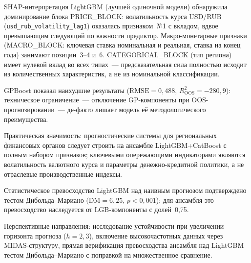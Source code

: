 \documentclass[12pt,a4paper]{article}
\begin{document}
SHAP-интерпретация LightGBM (лучшей одиночной модели) обнаружила
доминирование блока PRICE\_BLOCK: волатильность курса USD/RUB
(\texttt{usd\_rub\_volatility\_lag1}) оказалась признаком~№1 с вкладом,
вдвое превышающим следующий по важности предиктор. Макро-монетарные
признаки (MACRO\_BLOCK: ключевая ставка номинальная и реальная,
ставка на конец года) занимают позиции~3--4 и~6. CATEGORICAL\_BLOCK
(тип региона) имеет нулевой вклад во всех типах~--- предсказательная
сила полностью исходит из количественных характеристик, а не из
номинальной классификации.

GPBoost показал наихудшие результаты ($\mathrm{RMSE} = 0{,}488$,
$R^2_{\mathrm{OOS}} = -280{,}9$): техническое ограничение~---
отключение GP-компоненты при OOS-прогнозировании~--- де-факто
лишает модель её методологического преимущества.

Практическая значимость: прогностические системы для региональных
финансовых органов следует строить на ансамбле LightGBM+CatBoost
с полным набором признаков; ключевыми опережающими индикаторами
являются волатильность валютного курса и параметры денежно-кредитной
политики, а не отраслевые производственные индексы.

Статистическое превосходство LightGBM над наивным прогнозом подтверждено
тестом Дибольда--Мариано ($\mathrm{DM} = 6{,}25$, $p < 0{,}001$);
для ансамбля это превосходство наследуется от LGB-компоненты с долей~0{,}75.

Перспективные направления: исследование устойчивости при увеличении
горизонта прогноза ($h=2,3$), включение высокочастотных данных через
MIDAS-структуру, прямая верификация превосходства ансамбля над LightGBM
тестом Дибольда--Мариано с поправкой на множественное сравнение.
\end{document}

